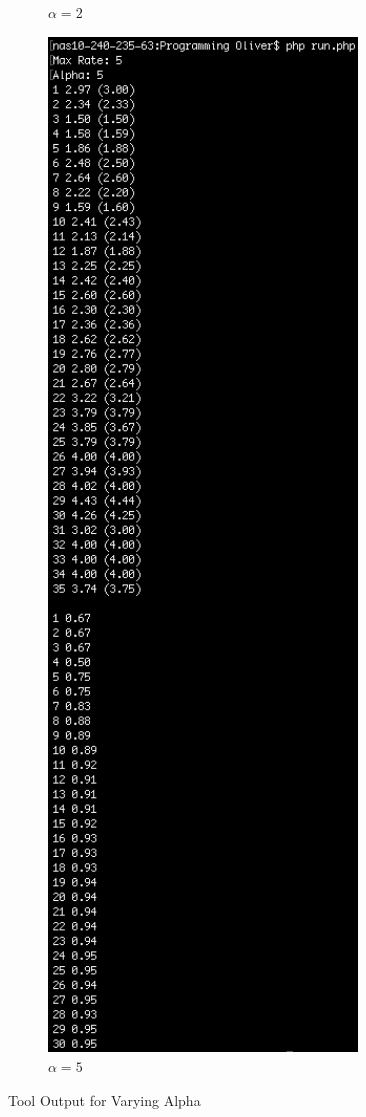 \documentclass{article}
\begin{document}
\begin{figure}[htp]
\begin{subfigure}{0.45\textwidth}
\caption{$\alpha = 2$}
\label{fig:screen_alpha2}
\end{subfigure}%
\begin{subfigure}{0.45\textwidth}
\centering
\includegraphics[width=0.9\textwidth]{Screenshots/Alpha5}
\caption{$\alpha = 5$}
\label{fig:screen_alpha5}
\end{subfigure}
\caption{Tool Output for Varying Alpha}
\label{fig:tool_output}
\end{figure}
\end{document}

